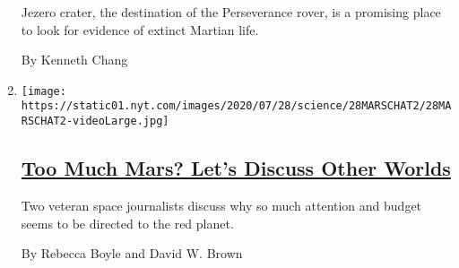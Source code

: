 \begin{enumerate}
  Jezero crater, the destination of the Perseverance rover, is a
  promising place to look for evidence of extinct Martian life.

  By Kenneth Chang
\item
  \texttt{[image: https://static01.nyt.com/images/2020/07/28/science/28MARSCHAT2/28MARSCHAT2-videoLarge.jpg]}

  \hypertarget{too-much-mars-lets-discuss-other-worlds}{%
  \subsection{\texorpdfstring{\href{/2020/07/28/science/mars-nasa-science.html}{Too
  Much Mars? Let's Discuss Other
  Worlds}}{Too Much Mars? Let's Discuss Other Worlds}}\label{too-much-mars-lets-discuss-other-worlds}}

  Two veteran space journalists discuss why so much attention and budget
  seems to be directed to the red planet.

  By Rebecca Boyle and David W. Brown
\end{enumerate}

